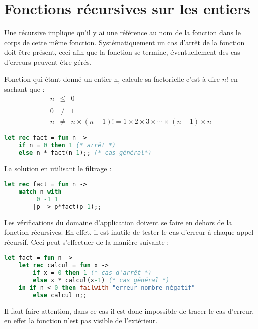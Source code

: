 \section{Fonctions récursives sur les entiers}\label{recurseInt}
Une récursive implique qu'il y ai une référence au nom de la fonction dans le corps de cette même fonction. Systématiquement un cas d'arrêt de la
fonction doit être présent, ceci afin que la fonction se termine, éventuellement des cas d'erreurs peuvent être gérés.
\begin{exemple}
	Fonction qui étant donné un entier n, calcule sa factorielle c'est-à-dire $n!$ en sachant que : 
	\begin{eqnarray*}
		n &\leq& 0\\\ &&\\
		0 &\neq& 1\\
		n &\neq& n\times (n-1)! = 1\times 2\times 3\times\cdots\times (n-1)\times n
	\end{eqnarray*}
	\begin{lstlisting}[language=Caml, caption=Exemple de la fonction factorielle en récursif, numbers=none, framerule=0pt]
let rec fact = fun n -> 
	if n = 0 then 1 (* arrêt *)
	else n * fact(n-1);; (* cas général*)
	\end{lstlisting}
	 
	La solution en utilisant le filtrage : 
	\begin{lstlisting}[language=Caml, caption=Exemple de la fonction factorielle avec filtrage, numbers=none, framerule=0pt]
let rec fact = fun n ->
	match n with
		 0 -1 1
		|p -> p*fact(p-1);;
	\end{lstlisting}
\end{exemple}

Les vérifications du domaine d'application doivent se faire en dehors de la fonction récursives. En effet, il est inutile de tester le cas d'erreur à
chaque appel récursif. Ceci peut s'effectuer de la manière suivante : 
	\begin{lstlisting}[language=Caml, caption=Exemple de la fonction factorielle avec un cas d'erreur, numbers=none]
let fact = fun n ->
	let rec calcul = fun x ->
		if x = 0 then 1 (* cas d'arrêt *)
		else x * calcul(x-1) (* cas général *)
	in if n < 0 then failwith "erreur nombre négatif"
		else calcul n;;
	\end{lstlisting}

	\begin{remarque}
		Il faut faire attention, dans ce cas il est donc impossible de tracer le cas d'erreur, en effet la fonction n'est pas visible de l'extérieur.
	\end{remarque}


